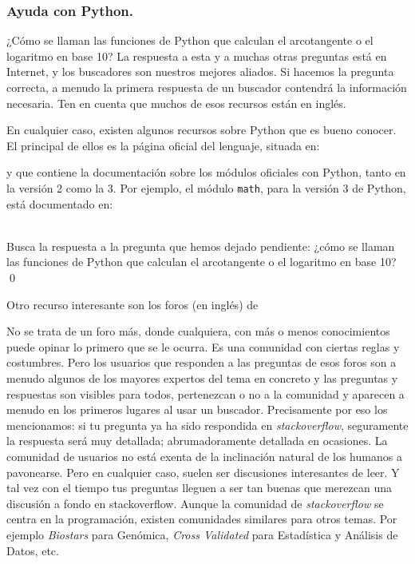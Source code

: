 \documentclass[10pt,a4paper]{article}\usepackage[]{graphicx}\usepackage[]{color}
\newcounter {cont01}
\begin{document}
\subsubsection*{Ayuda con Python.}
\label{tut02:subsubsec:ayudaPython}

¿Cómo se llaman las funciones de Python que calculan el arcotangente o el logaritmo en base 10? La respuesta a esta y a muchas otras preguntas está en Internet, y los buscadores son nuestros mejores aliados. Si hacemos la pregunta correcta, a menudo la primera respuesta de un buscador contendrá la información necesaria. Ten en cuenta que muchos de esos recursos están en inglés.

En cualquier caso, existen algunos recursos sobre Python que es bueno conocer. El principal de ellos es la página oficial del lenguaje, situada en:
\begin{center}
\end{center}
y que contiene la documentación sobre los módulos oficiales con Python, tanto en la versión 2 como la 3. Por ejemplo, el módulo {\tt math}, para la versión 3 de Python, está documentado en:
\begin{center}
\end{center}

\begin{ejercicio}
\label{tut02:ejercicio04}
\quad\\
Busca la respuesta a la pregunta que hemos dejado pendiente: ¿cómo se llaman las funciones de Python que calculan el arcotangente o el logaritmo en base 10?
\qed
\end{ejercicio}

Otro recurso interesante son los foros (en inglés) de
\begin{center}
\end{center}
No se trata de un foro más, donde cualquiera, con más o menos conocimientos puede opinar lo primero que se le ocurra. Es una comunidad con ciertas reglas y costumbres. Pero los usuarios que responden a las preguntas de esos foros son a menudo algunos de los mayores expertos del tema en concreto y las preguntas y respuestas son visibles para todos, pertenezcan o no a la comunidad y aparecen a menudo en los primeros lugares al usar un buscador. Precisamente por eso los mencionamos: si tu pregunta ya ha sido respondida en {\em stackoverflow}, seguramente la respuesta será muy detallada; abrumadoramente detallada en ocasiones. La comunidad de usuarios no está exenta de la inclinación natural de los humanos a pavonearse. Pero en cualquier caso, suelen ser discusiones interesantes de leer. Y tal vez con el tiempo tus preguntas lleguen a ser tan buenas que merezcan una discusión a fondo en stackoverflow. Aunque la comunidad de {\em stackoverflow} se centra en la programación, existen comunidades similares para otros temas. Por ejemplo {\em Biostars} para Genómica, {\em Cross Validated} para Estadística y Análisis de Datos, etc. 
\end{document}
